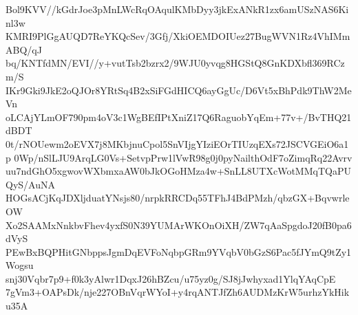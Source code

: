 Bol9KVV//kGdrJoe3pMnLWcRqOAqulKMbDyy3jkExANkR1zx6amUSzNAS6Kinl3w
KMRI9PlGgAUQD7ReYKQcSev/3Gfj/XkiOEMDOIUez27BugWVN1Rz4VhIMmABQ/qJ
bq/KNTfdMN/EVI//y+vutTsb2bzrx2/9WJU0yvqg8HGStQ8GnKDXbfl369RCzm/S
IKr9Gki9JkE2oQJOr8YRtSq4B2xSiFGdHICQ6ayGgUc/D6Vt5xBhPdk9ThW2MeVn
oLCAjYLmOF790pm4oV3c1WgBEfIPtXniZ17Q6RaguobYqEm+77v+/BvTHQ21dBDT
0t/rNOUewm2oEVX7j8MKbjnuCpol5SnVIjgYIziEOrTIUzqEXs72JSCVGEiO6a1p
0Wp/nSlLJU9ArqLG0Vs+SetvpPrw1lVwR98g0j0pyNailthOdF7oZimqRq22Avrv
uu7ndGhO5xgwovWXbmxaAW0bJkOGoHMza4w+SnLL8UTXcWotMMqTQaPUQyS/AuNA
HOGsACjKqJDXljduatYNsjs80/nrpkRRCDq55TFhJ4BdPMzh/qbzGX+BqvwrleOW
Xo2SAAMxNnkbvFhev4yxfS0N39YUMArWKOnOiXH/ZW7qAaSpgdoJ20fB0pa6dVyS
PEwBxBQPHitGNbppsJgmDqEVFoNqbpGRm9YVqbV0bGzS6Pac5fJYmQ9tZy1Wogsu
snj30Vqbr7p9+f0k3yAlwr1DqxJ26hBZcu/u75yz0g/SJ8jJwhyxad1YlqYAqCpE
7gVm3+OAPsDk/nje227OBnVqrWYoI+y4rqANTJfZh6AUDMzKrW5urhzYkHiku35A
